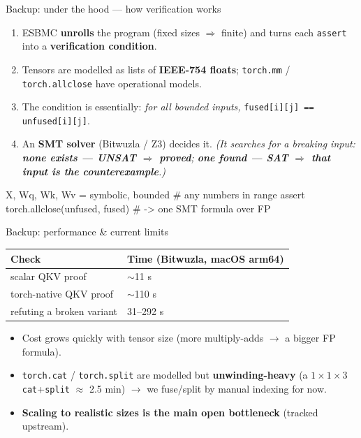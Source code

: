 \documentclass[aspectratio=169,11pt]{beamer}
\begin{document}
\begin{frame}[fragile]{Backup: under the hood --- how verification works}
  \begin{enumerate}
    \item ESBMC \textbf{unrolls} the program (fixed sizes $\Rightarrow$ finite) and turns each
      \texttt{assert} into a \textbf{verification condition}.
    \item Tensors are modelled as lists of \textbf{IEEE-754 floats}; \texttt{torch.mm} /
      \texttt{torch.allclose} have operational models.
    \item The condition is essentially: \emph{for all bounded inputs,} \texttt{fused[i][j] == unfused[i][j]}.
    \item An \textbf{SMT solver} (Bitwuzla / Z3) decides it. \emph{(It searches for a breaking
      input: \textbf{none exists --- UNSAT $\Rightarrow$ proved}; \textbf{one found --- SAT
      $\Rightarrow$ that input is the counterexample}.)}
  \end{enumerate}

  \begin{semiverbatim}\footnotesize
X, Wq, Wk, Wv = symbolic, bounded        \# any numbers in range
assert torch.allclose(unfused, fused)    \# -> one SMT formula over FP
  \end{semiverbatim}
\end{frame}

\begin{frame}{Backup: performance \& current limits}
  \begin{center}
  \begin{tabular}{@{}ll@{}}
    \toprule
    \textbf{Check} & \textbf{Time} (Bitwuzla, macOS arm64) \\
    \midrule
    scalar QKV proof & $\sim$11 s \\
    torch-native QKV proof & $\sim$110 s \\
    refuting a broken variant & 31--292 s \\
    \bottomrule
  \end{tabular}
  \end{center}

  \begin{itemize}
    \item Cost grows quickly with tensor size (more multiply-adds $\rightarrow$ a bigger FP formula).
    \item \texttt{torch.cat} / \texttt{torch.split} are modelled but \textbf{unwinding-heavy}
      (a $1{\times}1{\times}3$ \texttt{cat}+\texttt{split} $\approx$ 2.5 min) $\rightarrow$ we fuse/split
      by manual indexing for now.
    \item \textbf{Scaling to realistic sizes is the main open bottleneck} (tracked upstream).
  \end{itemize}
\end{frame}
\end{document}
